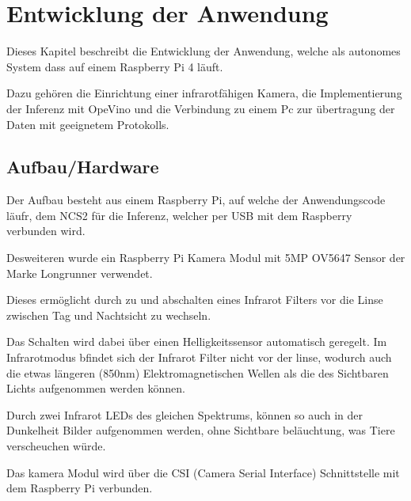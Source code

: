 
\chapter{Entwicklung der Anwendung}\label{kap:application}


Dieses Kapitel beschreibt die Entwicklung der Anwendung,
welche als autonomes System dass auf einem Raspberry Pi 4 läuft.

Dazu gehören die Einrichtung einer infrarotfähigen 
Kamera, die Implementierung der Inferenz mit OpeVino
und die Verbindung zu einem Pc zur übertragung
der Daten mit geeignetem Protokolls.



\section{Aufbau/Hardware}\label{sec:aufbau}


Der Aufbau besteht aus einem Raspberry Pi, auf welche 
der Anwendungscode läufr, dem NCS2 für die Inferenz, 
welcher per USB mit dem Raspberry verbunden wird.

Desweiteren wurde ein Raspberry Pi Kamera Modul mit 
5MP OV5647 Sensor der Marke Longrunner verwendet.

Dieses ermöglicht durch zu und abschalten eines Infrarot 
Filters vor die Linse zwischen Tag und Nachtsicht zu wechseln.

Das Schalten wird dabei über einen Helligkeitssensor automatisch 
geregelt. Im Infrarotmodus bfindet sich der Infrarot Filter nicht 
vor der linse, wodurch auch die etwas längeren (850nm)
Elektromagnetischen Wellen als die des Sichtbaren Lichts aufgenommen 
werden können.

Durch zwei Infrarot LEDs des gleichen Spektrums, können so 
auch in der Dunkelheit Bilder aufgenommen werden, ohne 
Sichtbare beläuchtung, was Tiere verscheuchen würde.


Das kamera Modul wird über die CSI (Camera Serial Interface) 
Schnittstelle mit dem Raspberry Pi verbunden.




